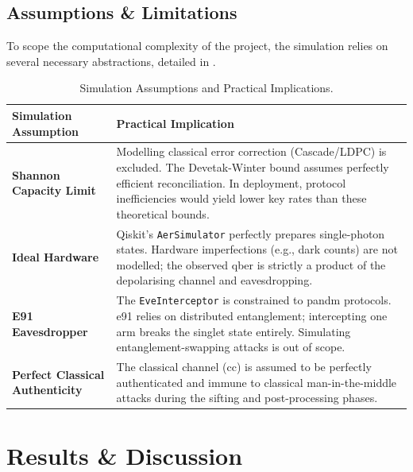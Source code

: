 \documentclass[11pt, a4paper]{report}
\renewcommand{\footnotesize}{\fontsize{9}{10}\selectfont}
\begin{document}
\newpage
\section{Assumptions \& Limitations}
\label{sec:assumptionslimitations}

To scope the computational complexity of the project, the simulation relies on several necessary abstractions, detailed in .

\begin{table}[htbp]
\centering
\caption{Simulation Assumptions and Practical Implications.}
\label{tab:limitations}
\footnotesize
\begin{tabularx}{\linewidth}{@{}l X@{}}
\toprule
\textbf{Simulation Assumption} & \textbf{Practical Implication} \\
\midrule
\textbf{Shannon Capacity Limit} & Modelling classical error correction (Cascade/LDPC) is excluded. The Devetak-Winter bound assumes perfectly efficient reconciliation. In deployment, protocol inefficiencies would yield lower key rates than these theoretical bounds. \\
\addlinespace
\textbf{Ideal Hardware} & Qiskit's \texttt{AerSimulator} perfectly prepares single-photon states. Hardware imperfections (e.g., dark counts) are not modelled; the observed \gls{qber} is strictly a product of the depolarising channel and eavesdropping. \\
\addlinespace
\textbf{E91 Eavesdropper} & The \texttt{EveInterceptor} is constrained to \gls{pandm} protocols. \gls{e91} relies on distributed entanglement; intercepting one arm breaks the singlet state entirely. Simulating entanglement-swapping attacks is out of scope. \\
\addlinespace
\textbf{Perfect Classical Authenticity} & The classical channel (\gls{cc}) is assumed to be perfectly authenticated and immune to classical man-in-the-middle attacks during the sifting and post-processing phases. \\
\bottomrule
\end{tabularx}
\end{table}


\chapter{Results \& Discussion}
\end{document}
